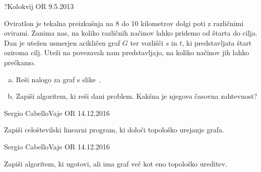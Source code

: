 \begin{naloga}{?}{Kolokvij OR 9.5.2013}
\begin{vprasanje}[oviratlon]
Oviratlon je tekalna preizkušnja
na 8 do 10 kilometrov dolgi poti z različnimi ovirami.
Zanima nas, na koliko različnih načinov lahko pridemo od štarta do cilja.
Dan je utežen usmerjen acikličen graf $G$ ter vozlišči $s$ in $t$,
ki predstavljata štart oziroma cilj.
Uteži na povezavah nam predstavljajo,
na koliko načinov jih lahko prečkamo.

\begin{enumerate}[(a)]
\item Reši nalogo za graf s slike~\fig{}.

\item Zapiši algoritem, ki reši dani problem.
Kakšna je njegova časovna zahtevnost?
\end{enumerate}

\begin{slika}
\pgfslika
{}
\end{slika}
\end{vprasanje}
\begin{odgovor}
\end{odgovor}
\end{naloga}


\begin{naloga}{Sergio Cabello}{Vaje OR 14.12.2016}
\begin{vprasanje}[topoclp]
Zapiši celoštevilski linearni program, ki določi topološko urejanje grafa.
\end{vprasanje}
\begin{odgovor}
\end{odgovor}
\end{naloga}


\begin{naloga}{Sergio Cabello}{Vaje OR 14.12.2016}
\begin{vprasanje}[vectopo]
Zapiši algoritem, ki ugotovi, ali ima graf več kot eno topološko ureditev.
\end{vprasanje}
\begin{odgovor}
\end{odgovor}
\end{naloga}



